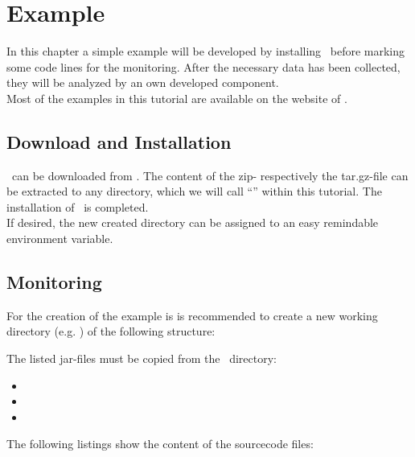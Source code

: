 \chapter{Example}
	In this chapter a simple example will be developed by installing \Kieker\ before marking some code lines for the monitoring. After the necessary data has been collected, they will be analyzed by an own developed component.\\
	\notify Most of the examples in this tutorial are available on the website of \Kieker.

	\section{Download and Installation}
		\Kieker\  can be downloaded from \KiekerURL. The content of the zip- respectively the tar.gz-file can be extracted to any directory, which we will call ``\KiekerDir'' within this tutorial. The installation of \Kieker\ is completed.\\
		If desired, the new created directory can be assigned to an easy remindable environment variable.


	\section{Monitoring}
		For the creation of the example is is recommended to create a new working directory (e.g. ) of the following structure:

		The listed jar-files must be copied from the \Kieker\  directory:
		\begin{itemize}
			\item {}
			\item {}
			\item {}
		\end{itemize}
		The following listings show the content of the sourcecode files:
		\setJavaCodeListing       
		

